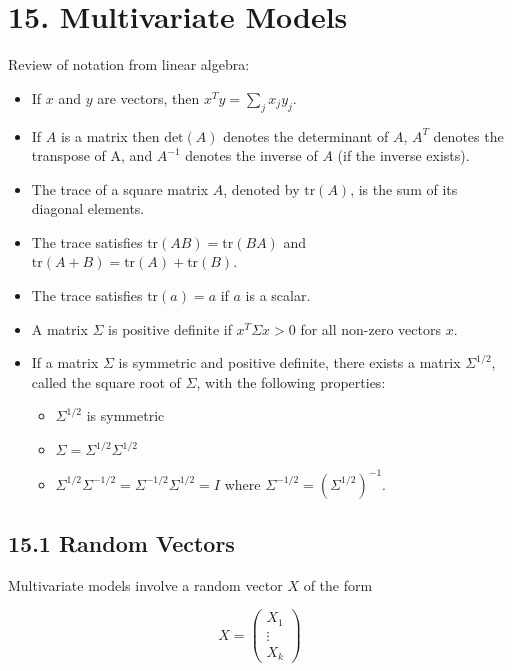 \section*{15. Multivariate Models}\label{multivariate-models}

Review of notation from linear algebra:

\begin{itemize}[tightlist]
\item
  If \(x\) and \(y\) are vectors, then \(x^T y = \sum_{j} x_{j} y_{j}\).
\item
  If \(A\) is a matrix then \(\text{det}(A)\) denotes the determinant of
  \(A\), \(A^T\) denotes the transpose of A, and \(A^{-1}\) denotes the
  inverse of \(A\) (if the inverse exists).
\item
  The trace of a square matrix \(A\), denoted by \(\text{tr}(A)\), is
  the sum of its diagonal elements.
\item
  The trace satisfies \(\text{tr}(AB) = \text{tr}(BA)\) and
  \(\text{tr}(A + B) = \text{tr}(A) + \text{tr}(B)\).
\item
  The trace satisfies \(\text{tr}(a) = a\) if \(a\) is a scalar.
\item
  A matrix \(\Sigma\) is positive definite if \(x^T \Sigma x > 0\) for
  all non-zero vectors \(x\).
\item
  If a matrix \(\Sigma\) is symmetric and positive definite, there
  exists a matrix \(\Sigma^{1/2}\), called the square root of
  \(\Sigma\), with the following properties:

  \begin{itemize}[tightlist]
  \item
\(\Sigma^{1/2}\) is symmetric
  \item
\(\Sigma = \Sigma^{1/2} \Sigma^{1/2}\)
  \item
\(\Sigma^{1/2} \Sigma^{-1/2} = \Sigma^{-1/2} \Sigma^{1/2} = I\)
    where \(\Sigma^{-1/2} = (\Sigma^{1/2})^{-1}\).
  \end{itemize}
\end{itemize}

\subsection*{15.1 Random Vectors}\label{random-vectors}

    Multivariate models involve a random vector \(X\) of the form

\[X = \begin{pmatrix} X_{1} \\ \vdots \\ X_{k} \end{pmatrix}\]

